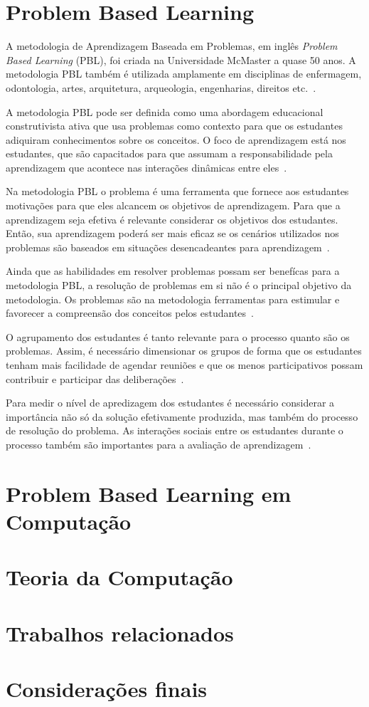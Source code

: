 \acresetall
\section{Problem Based Learning}

A metodologia de Aprendizagem Baseada em Problemas, em inglês \textit{Problem Based Learning} (PBL),
foi criada na Universidade McMaster a quase 50 anos.
A metodologia PBL também é utilizada amplamente em disciplinas de enfermagem,
odontologia, artes, arquitetura, arqueologia, engenharias, direitos
etc.~\cite{albanese2010problem, amos1998problem}.

A metodologia PBL pode ser definida como uma abordagem educacional
construtivista ativa que usa problemas como contexto para que os estudantes
adiquiram conhecimentos sobre os conceitos. O foco de aprendizagem está
nos estudantes, que são capacitados para que assumam a responsabilidade pela
aprendizagem que acontece nas interações dinâmicas
entre eles~\cite{dolmans2005problem, albanese2010problem, amos1998problem}.

Na metodologia PBL o problema é uma ferramenta que fornece
aos estudantes motivações para que eles alcancem os
objetivos de aprendizagem.
Para que a aprendizagem seja efetiva é relevante considerar os objetivos
dos estudantes.
Então, sua aprendizagem poderá ser mais eficaz se os cenários utilizados
nos problemas são baseados em situações desencadeantes para
aprendizagem~\cite{wood2003problem, o2012practical, amos1998problem}.

Ainda que as habilidades em resolver problemas possam ser benefícas
para a metodologia PBL, a resolução de problemas em si não é o
principal objetivo da metodologia.
Os problemas são na metodologia ferramentas para estimular e
favorecer a compreensão dos conceitos pelos
estudantes~\cite{wood2003problem,amos1998problem}.

O agrupamento dos estudantes é tanto relevante para o processo quanto
são os problemas. Assim, é necessário dimensionar os grupos de forma
que os estudantes tenham mais facilidade de agendar reuniões e que
os menos participativos possam contribuir e participar das
deliberações~\cite{albanese2010problem}.


Para medir o nível de apredizagem dos estudantes é necessário considerar
a importância não só da solução efetivamente produzida, mas também do
processo de resolução do problema.
As interações sociais entre os estudantes durante
o processo também são importantes para a
avaliação de aprendizagem~\cite{albanese2010problem}.


\section{Problem Based Learning em Computação}
\section{Teoria da Computação}
\section{Trabalhos relacionados}
\section{Considerações finais}
